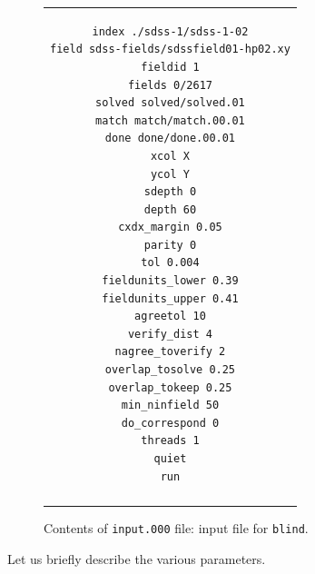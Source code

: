 \documentclass[12pt,letterpaper,titlepage]{article}
\newcommand{\code}[1]{\texttt{#1}}
\begin{document}
\begin{figure}[h!]
\begin{center}
\begin{tabular}{|@{\hspace{24pt}}c@{\hspace{24pt}}|}
\hline
\begin{minipage}{0.6\textwidth}
\vspace{10pt}
\begin{verbatim}
index ./sdss-1/sdss-1-02
field sdss-fields/sdssfield01-hp02.xy
fieldid 1
fields 0/2617
solved solved/solved.01
match match/match.00.01
done done/done.00.01
xcol X
ycol Y
sdepth 0
depth 60
cxdx_margin 0.05
parity 0
tol 0.004
fieldunits_lower 0.39
fieldunits_upper 0.41
agreetol 10
verify_dist 4
nagree_toverify 2
overlap_tosolve 0.25
overlap_tokeep 0.25
min_ninfield 50
do_correspond 0
threads 1
quiet
run
\end{verbatim}
\end{minipage}%
\\
\rule{0pt}{4pt} \\
\hline
\end{tabular}
\end{center}
\caption{Contents of \code{input.000} file: input file for \code{blind}.}
\label{input000}
\end{figure}

Let us briefly describe the various parameters.
\end{document}

